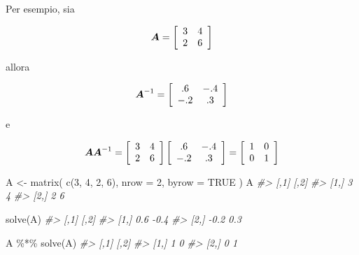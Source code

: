 \documentclass[
  11pt,
]{krantz}
\makeatletter
\newenvironment{Shaded}{\begin{snugshade}}{\end{snugshade}}
\newcommand{\AttributeTok}[1]{\textcolor[rgb]{0.61,0.61,0.61}{#1}}
\newcommand{\CommentTok}[1]{\textcolor[rgb]{0.37,0.37,0.37}{\textit{#1}}}
\newcommand{\ConstantTok}[1]{\textcolor[rgb]{0,0,0}{#1}}
\newcommand{\DecValTok}[1]{\textcolor[rgb]{0.06,0.06,0.06}{#1}}
\newcommand{\FunctionTok}[1]{\textcolor[rgb]{0,0,0}{#1}}
\newcommand{\NormalTok}[1]{#1}
\newcommand{\OtherTok}[1]{\textcolor[rgb]{0.37,0.37,0.37}{#1}}
\newcommand{\SpecialCharTok}[1]{\textcolor[rgb]{0,0,0}{#1}}
\newenvironment{kframe}{%
\medskip{}
\setlength{\fboxsep}{.8em}
 \def\at@end@of@kframe{}%
 \ifinner\ifhmode%
  \def\at@end@of@kframe{\end{minipage}}%
  \begin{minipage}{\columnwidth}%
 \fi\fi%
 \def\FrameCommand##1{\hskip\@totalleftmargin \hskip-\fboxsep
 \colorbox{shadecolor}{##1}\hskip-\fboxsep
     \hskip-\linewidth \hskip-\@totalleftmargin \hskip\columnwidth}%
 \MakeFramed {\advance\hsize-\width
   \@totalleftmargin\z@ \linewidth\hsize
   \@setminipage}}%
 {\par\unskip\endMakeFramed%
 \at@end@of@kframe}
\renewenvironment{Shaded}{\begin{kframe}}{\end{kframe}}
\theoremstyle{definition}
\theoremstyle{definition}
\theoremstyle{definition}
\theoremstyle{definition}
\theoremstyle{remark}
\makeatother
\begin{document}
Per esempio, sia

\[
\boldsymbol{A} =  \left[ \begin{array}{c c}
3 & 4 \\
2 & 6
\end{array}
 \right]
\]

allora

\[
\boldsymbol{A}^{-1} =  \left[ \begin{array}{c c}
.6 & -.4 \\
-.2 & .3
\end{array}
 \right]
\]

e

\[
\boldsymbol{A}\boldsymbol{A}^{-1} =\left[ \begin{array}{c c}
3 & 4 \\
2 & 6
\end{array}
 \right]
\left[ \begin{array}{c c}
.6 & -.4 \\
-.2 & .3
\end{array}
 \right] =
 \left[ \begin{array}{c c}
1 & 0 \\
0 & 1
\end{array}
 \right]
\]

\begin{Shaded}
\begin{Highlighting}[]
\NormalTok{A }\OtherTok{\textless{}{-}} \FunctionTok{matrix}\NormalTok{(}
  \FunctionTok{c}\NormalTok{(}\DecValTok{3}\NormalTok{, }\DecValTok{4}\NormalTok{, }\DecValTok{2}\NormalTok{, }\DecValTok{6}\NormalTok{),}
  \AttributeTok{nrow =} \DecValTok{2}\NormalTok{,}
  \AttributeTok{byrow =} \ConstantTok{TRUE}
\NormalTok{)}
\NormalTok{A}
\CommentTok{\#\textgreater{}      [,1] [,2]}
\CommentTok{\#\textgreater{} [1,]    3    4}
\CommentTok{\#\textgreater{} [2,]    2    6}
\end{Highlighting}
\end{Shaded}

\begin{Shaded}
\begin{Highlighting}[]
\FunctionTok{solve}\NormalTok{(A)}
\CommentTok{\#\textgreater{}      [,1] [,2]}
\CommentTok{\#\textgreater{} [1,]  0.6 {-}0.4}
\CommentTok{\#\textgreater{} [2,] {-}0.2  0.3}
\end{Highlighting}
\end{Shaded}

\begin{Shaded}
\begin{Highlighting}[]
\NormalTok{A }\SpecialCharTok{\%*\%} \FunctionTok{solve}\NormalTok{(A)}
\CommentTok{\#\textgreater{}      [,1] [,2]}
\CommentTok{\#\textgreater{} [1,]    1    0}
\CommentTok{\#\textgreater{} [2,]    0    1}
\end{Highlighting}
\end{Shaded}
\end{document}
